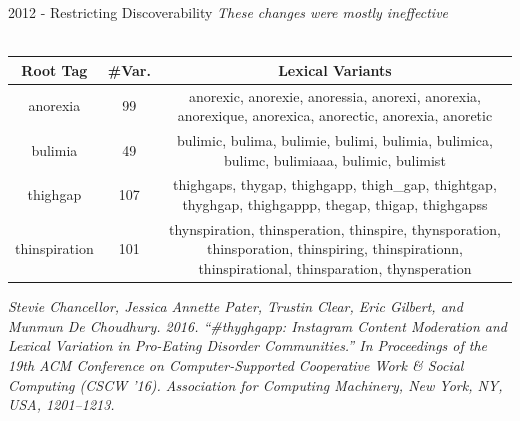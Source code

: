 \documentclass[nobackground,dvipsnames,table]{beamer}
\begin{document}
\begin{frame}{2012 - Restricting Discoverability}
    \textit{These changes were mostly ineffective}\\~\\
    \begin{tabular}{|c|c|c|}%
         \hline
         \textbf{Root Tag} & \textbf{\#Var.} & \textbf{Lexical Variants}\\
         \hline
         anorexia & 99 & anorexic, anorexie, anoressia, anorexi, anorexia, anorexique, anorexica, anorectic, anorexia, anoretic\\
         \hline
         bulimia & 49 & bulimic, bulima, bulimie, bulimi, bulimia, bulimica, bulimc, bulimiaaa, bulimic, bulimist\\
         \hline
         thighgap & 107 & thighgaps, thygap, thighgapp, thigh_gap, thightgap, thyghgap, thighgappp, thegap, thigap, thighgapss\\
         \hline
         thinspiration & 101 & thynspiration, thinsperation, thinspire, thynsporation, thinsporation, thinspiring, thinspirationn, thinspirational, thinsparation, thynsperation\\
         \hline
    \end{tabular}
    \tiny
    \textit{Stevie Chancellor, Jessica Annette Pater, Trustin Clear, Eric Gilbert, and Munmun De Choudhury. 2016. “\#thyghgapp: Instagram Content Moderation and Lexical Variation in Pro-Eating Disorder Communities.” In Proceedings of the 19th ACM Conference on Computer-Supported Cooperative Work \& Social Computing (CSCW '16). Association for Computing Machinery, New York, NY, USA, 1201–1213.}
\end{frame}
\end{document}
